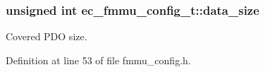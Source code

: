 \subsubsection[{data\-\_\-size}]{\setlength{\rightskip}{0pt plus 5cm}unsigned int ec\-\_\-fmmu\-\_\-config\-\_\-t\-::data\-\_\-size}\label{structec__fmmu__config__t_aa3e8f3f8fa7be48f2a1497cd2fbe8ad5}


Covered P\-D\-O size. 



Definition at line 53 of file fmmu\-\_\-config.\-h.

